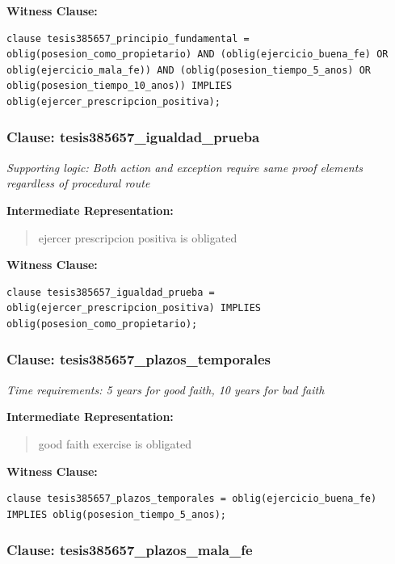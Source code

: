 \documentclass[11pt,a4paper]{article}
\begin{document}
\textbf{Witness Clause:}

\begin{lstlisting}[style=witnessstyle, language=Witness]
clause tesis385657_principio_fundamental = oblig(posesion_como_propietario) AND (oblig(ejercicio_buena_fe) OR oblig(ejercicio_mala_fe)) AND (oblig(posesion_tiempo_5_anos) OR oblig(posesion_tiempo_10_anos)) IMPLIES oblig(ejercer_prescripcion_positiva);
\end{lstlisting}

\subsubsection{Clause: tesis385657\_igualdad\_prueba}

\textit{Supporting logic: Both action and exception require same proof elements regardless of procedural route}

\textbf{Intermediate Representation:}

\begin{quote}
ejercer prescripcion positiva is obligated
\end{quote}

\textbf{Witness Clause:}

\begin{lstlisting}[style=witnessstyle, language=Witness]
clause tesis385657_igualdad_prueba = oblig(ejercer_prescripcion_positiva) IMPLIES oblig(posesion_como_propietario);
\end{lstlisting}

\subsubsection{Clause: tesis385657\_plazos\_temporales}

\textit{Time requirements: 5 years for good faith, 10 years for bad faith}

\textbf{Intermediate Representation:}

\begin{quote}
good faith exercise is obligated
\end{quote}

\textbf{Witness Clause:}

\begin{lstlisting}[style=witnessstyle, language=Witness]
clause tesis385657_plazos_temporales = oblig(ejercicio_buena_fe) IMPLIES oblig(posesion_tiempo_5_anos);
\end{lstlisting}

\subsubsection{Clause: tesis385657\_plazos\_mala\_fe}
\end{document}
